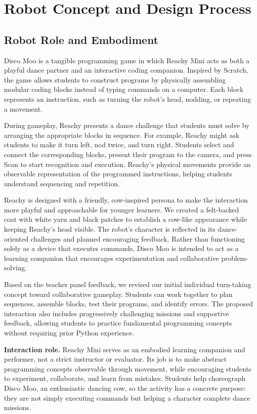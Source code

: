 \documentclass[conference]{IEEEtran}
\begin{document}
\section{Robot Concept and Design Process}
\label{sec:designprocess}

\subsection{Robot Role and Embodiment}
\label{sec:role}

Disco Moo is a tangible programming game in which Reachy Mini acts as both a playful dance partner and an interactive coding companion. Inspired by Scratch, the game allows students to construct programs by physically assembling modular coding blocks instead of typing commands on a computer. Each block represents an instruction, such as turning the robot's head, nodding, or repeating a movement.

During gameplay, Reachy presents a dance challenge that students must solve by arranging the appropriate blocks in sequence. For example, Reachy might ask students to make it turn left, nod twice, and turn right. Students select and connect the corresponding blocks, present their program to the camera, and press Scan to start recognition and execution. Reachy's physical movements provide an observable representation of the programmed instructions, helping students understand sequencing and repetition.

Reachy is designed with a friendly, cow-inspired persona to make the interaction more playful and approachable for younger learners. We created a felt-backed coat with white yarn and black patches to establish a cow-like appearance while keeping Reachy's head visible. The robot's character is reflected in its dance-oriented challenges and planned encouraging feedback. Rather than functioning solely as a device that executes commands, Disco Moo is intended to act as a learning companion that encourages experimentation and collaborative problem-solving.

Based on the teacher panel feedback, we revised our initial individual turn-taking concept toward collaborative gameplay. Students can work together to plan sequences, assemble blocks, test their programs, and identify errors. The proposed interaction also includes progressively challenging missions and supportive feedback, allowing students to practice fundamental programming concepts without requiring prior Python experience.

\textbf{Interaction role.} Reachy Mini serves as an embodied learning companion and performer, not a strict instructor or evaluator. Its job is to make abstract programming concepts observable through movement, while encouraging students to experiment, collaborate, and learn from mistakes. Students help choreograph Disco Moo, an enthusiastic dancing cow, so the activity has a concrete purpose: they are not simply executing commands but helping a character complete dance missions.
\end{document}
